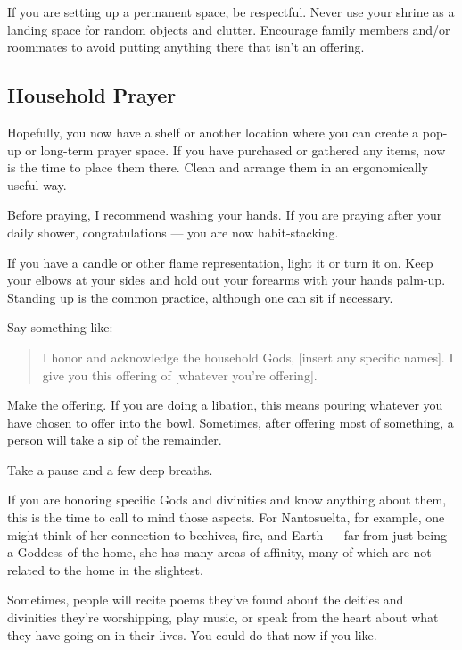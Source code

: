 \documentclass[
]{book}
\begin{document}
If you are setting up a permanent space, be respectful. Never use your shrine as a landing space for random objects and clutter. Encourage family members and/or roommates to avoid putting anything there that isn't an offering.

\hypertarget{household-prayer}{%
\subsection{Household Prayer}\label{household-prayer}}

Hopefully, you now have a shelf or another location where you can create a pop-up or long-term prayer space. If you have purchased or gathered any items, now is the time to place them there. Clean and arrange them in an ergonomically useful way.

Before praying, I recommend washing your hands. If you are praying after your daily shower, congratulations --- you are now habit-stacking.

If you have a candle or other flame representation, light it or turn it on. Keep your elbows at your sides and hold out your forearms with your hands palm-up. Standing up is the common practice, although one can sit if necessary.

Say something like:

\begin{quote}
I honor and acknowledge the household Gods, {[}insert any specific names{]}. I give you this offering of {[}whatever you're offering{]}.
\end{quote}

Make the offering. If you are doing a libation, this means pouring whatever you have chosen to offer into the bowl. Sometimes, after offering most of something, a person will take a sip of the remainder.

Take a pause and a few deep breaths.

If you are honoring specific Gods and divinities and know anything about them, this is the time to call to mind those aspects. For Nantosuelta, for example, one might think of her connection to beehives, fire, and Earth --- far from just being a Goddess of the home, she has many areas of affinity, many of which are not related to the home in the slightest.

Sometimes, people will recite poems they've found about the deities and divinities they're worshipping, play music, or speak from the heart about what they have going on in their lives. You could do that now if you like.
\end{document}
